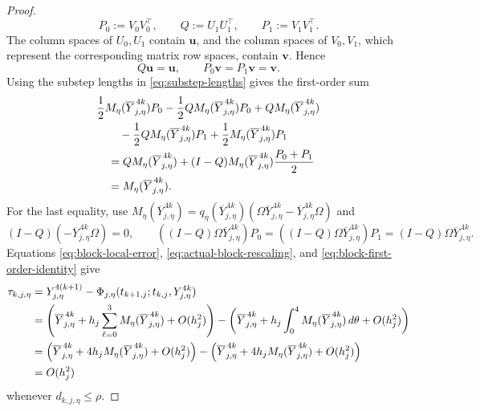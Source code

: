 \documentclass[]{article}
\numberwithin{equation}{section}
\theoremstyle{plain}
\theoremstyle{remark}
\begin{document}
\begin{proof}
\begin{equation}
 P_0:=V_0V_0^\top,\qquad Q:=U_1U_1^\top,\qquad
 P_1:=V_1V_1^\top.
\end{equation}
The column spaces of $U_0,U_1$ contain $\boldsymbol u$, and the column
spaces of $V_0,V_1$, which represent the corresponding matrix row
spaces, contain $\boldsymbol v$.  Hence
\[
 Q\boldsymbol u=\boldsymbol u,\qquad
 P_0\boldsymbol v=P_1\boldsymbol v=\boldsymbol v.
\]
Using the substep lengths in \eqref{eq:substep-lengths} gives the
first-order sum
\begin{align}
 &\frac12M_\eta(\overline Y_{j,\eta}^{\,4k})P_0
 -\frac12QM_\eta(\overline Y_{j,\eta}^{\,4k})P_0
 +QM_\eta(\overline Y_{j,\eta}^{\,4k})\notag\\
 &\qquad
 -\frac12QM_\eta(\overline Y_{j,\eta}^{\,4k})P_1
 +\frac12M_\eta(\overline Y_{j,\eta}^{\,4k})P_1\notag\\
 &\quad=QM_\eta(\overline Y_{j,\eta}^{\,4k})
 +(I-Q)M_\eta(\overline Y_{j,\eta}^{\,4k})\frac{P_0+P_1}{2}\notag\\
 &\quad=M_\eta(\overline Y_{j,\eta}^{\,4k}).
 \label{eq:block-first-order-identity}
\end{align}
For the last equality, use
$M_\eta(\overline Y_{j,\eta}^{\,4k})
=q_\eta(\overline Y_{j,\eta}^{\,4k})
(\Omega\overline Y_{j,\eta}^{\,4k}
-\overline Y_{j,\eta}^{\,4k}\Omega)$ and
\[
 (I-Q)(-\overline Y_{j,\eta}^{\,4k}\Omega)=0,
 \qquad
 ((I-Q)\Omega\overline Y_{j,\eta}^{\,4k})P_0
 =((I-Q)\Omega\overline Y_{j,\eta}^{\,4k})P_1
 =(I-Q)\Omega\overline Y_{j,\eta}^{\,4k}.
\]
Equations \eqref{eq:block-local-error},
\eqref{eq:actual-block-rescaling}, and
\eqref{eq:block-first-order-identity} give
\begin{align}
 \tau_{k,j,\eta}
 &=Y_{j,\eta}^{4(k+1)}
 -\Phi_{j,\eta}(t_{k+1,j};t_{k,j},Y_{j,\eta}^{4k})\notag\\
 &=\left(
 \overline Y_{j,\eta}^{\,4k}
 +h_j\sum_{\ell=0}^3M_\eta(\overline Y_{j,\eta}^{\,4k})
 +O(h_j^2)\right)
 -\left(
 \overline Y_{j,\eta}^{\,4k}
 +h_j\int_0^4M_\eta(\overline Y_{j,\eta}^{\,4k})\,d\theta
 +O(h_j^2)\right)\notag\\
 &=\left(\overline Y_{j,\eta}^{\,4k}
 +4h_jM_\eta(\overline Y_{j,\eta}^{\,4k})+O(h_j^2)\right)-\left(
 \overline Y_{j,\eta}^{\,4k}
 +4h_jM_\eta(\overline Y_{j,\eta}^{\,4k})+O(h_j^2)\right)\notag\\
 &=O(h_j^2)
 \label{eq:block-error-first-order-cancellation}
\end{align}
whenever \(d_{k,j,\eta}\le\rho\).


\end{proof}
\end{document}
